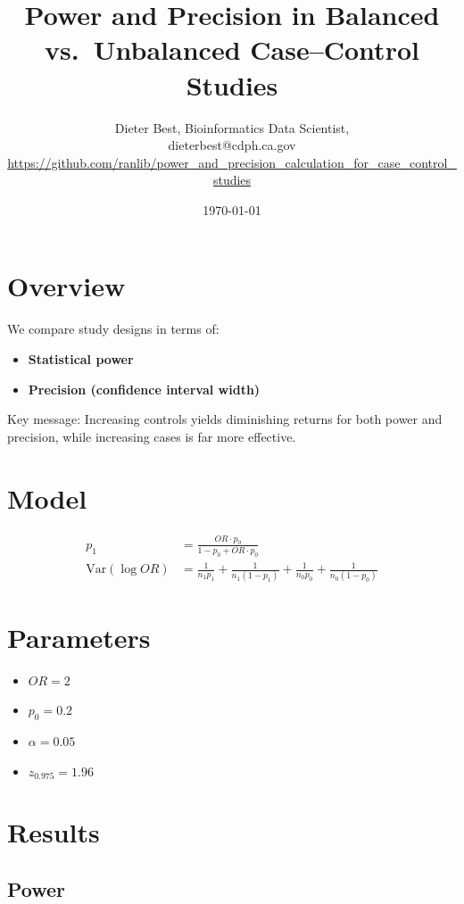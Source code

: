 \documentclass[11pt]{article}
\title{Power and Precision in Balanced vs.\ Unbalanced Case--Control Studies}
\author{Dieter Best, Bioinformatics Data Scientist, \\
  dieterbest@cdph.ca.gov \\
\url{https://github.com/ranlib/power_and_precision_calculation_for_case_control_studies}
}
\date{\today}
\begin{document}
\maketitle

\section{Overview}

We compare study designs in terms of:
\begin{itemize}
    \item \textbf{Statistical power}
    \item \textbf{Precision (confidence interval width)}
\end{itemize}

Key message: Increasing controls yields diminishing returns for both power and precision, while increasing cases is far more effective.

\section{Model}

\begin{align*}
p_1 &= \frac{OR \cdot p_0}{1 - p_0 + OR \cdot p_0} \\
\mathrm{Var}(\log OR) &= \frac{1}{n_1 p_1} + \frac{1}{n_1(1-p_1)} + \frac{1}{n_0 p_0} + \frac{1}{n_0(1-p_0)}
\end{align*}

\section{Parameters}

\begin{itemize}
    \item $OR = 2$
    \item $p_0 = 0.2$
    \item $\alpha = 0.05$
    \item $z_{0.975} = 1.96$
\end{itemize}

\newpage

\section{Results}

\subsection{Power}
\end{document}
